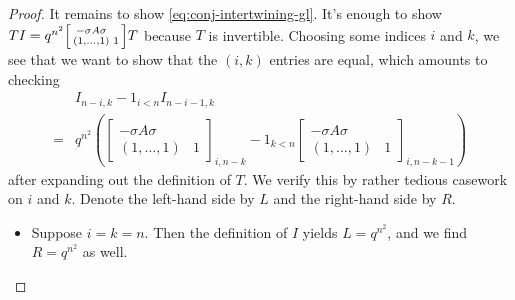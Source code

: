 \begin{proof}
    It remains to show \eqref{eq:conj-intertwining-gl}. It's enough to show $TI=q^{n^2}\begin{bsmallmatrix}
        -\sigma A\sigma \\ (1,\ldots,1) & 1
    \end{bsmallmatrix}T$ because $T$ is invertible. Choosing some indices $i$ and $k$,
    we see that we want to show that the $(i,k)$ entries are equal, which amounts to checking
    \begin{align*}
        & I_{n-i,k}-1_{i<n}I_{n-i-1,k} \\
        ={}& q^{n^2}\left(\begin{bmatrix}
            -\sigma A\sigma \\
            (1,\ldots,1) & 1
        \end{bmatrix}_{i,n-k}-1_{k<n}\begin{bmatrix}
            -\sigma A\sigma \\
            (1,\ldots,1) & 1
        \end{bmatrix}_{i,n-k-1}\right)
    \end{align*}
    after expanding out the definition of $T$.
    We verify this by rather tedious casework on $i$ and $k$. Denote the left-hand side by $L$ and the right-hand side by $R$.%
    \begin{itemize}
        \item Suppose $i=k=n$. Then the definition of $I$ yields $L=q^{n^2}$, and we find $R=q^{n^2}$ as well.

\end{itemize}
\end{proof}

